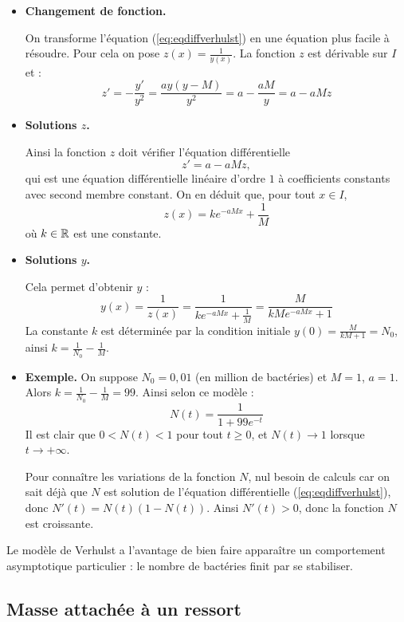 \documentclass[class=report,crop=false]{standalone}
\begin{document}
\begin{itemize}


  \item \textbf{Changement de fonction.}

  On transforme l'équation (\ref{eq:eqdiffverhulst})
  en une équation plus facile à résoudre.
  Pour cela on pose $z(x) = \frac{1}{y(x)}$.
  La fonction $z$ est dérivable sur $I$ et :
  $$z'=-\frac{y'}{y^2} = \frac{ay(y-M)}{y^2} = a - \frac{aM}{y} = a-aMz$$


  \item \textbf{Solutions $z$.}

  Ainsi la fonction $z$ doit vérifier l'équation différentielle
  $$z' = a-aMz,$$
  qui est une équation différentielle linéaire d'ordre $1$
  à coefficients constants avec second membre constant.
  On en déduit que, pour tout $x \in I$,
  $$z(x) = k e^{-aMx} + \frac1M$$
  où $k \in \mathbb{R}$ est une constante.

  \item \textbf{Solutions $y$.}

  Cela permet d'obtenir $y$ :
  $$y(x) = \frac{1}{z(x)} = \frac{1}{k e^{-aMx} + \frac1M} = \frac{M}{kM e^{-aMx}+1}$$
  La constante $k$ est déterminée par la condition initiale
  $y(0) = \frac{M}{kM+1}=N_0$, ainsi $k = \frac{1}{N_0}-\frac{1}{M}$.

  \item \textbf{Exemple.}
  On suppose $N_0 = 0,01$ (en million de bactéries) et $M=1$, $a=1$.
  Alors $k = \frac{1}{N_0}-\frac{1}{M} = 99$.
  Ainsi selon ce modèle :
  $$N(t) = \frac{1}{1 + 99 e^{-t}}$$
  Il est clair que $0<N(t)<1$ pour tout $t\ge0$, et
  $N(t) \to 1$ lorsque $t\to+\infty$.

  Pour connaître les variations de la fonction $N$, nul besoin de calculs car on sait déjà que
  $N$ est solution de l'équation différentielle (\ref{eq:eqdiffverhulst}), donc
  $N'(t) = N(t)(1 - N(t))$.
  Ainsi $N'(t)>0$, donc la fonction $N$ est croissante.
\end{itemize}



Le modèle de Verhulst a l'avantage de
bien faire apparaître un comportement asymptotique particulier :
le nombre de bactéries finit par se stabiliser.




\subsection{Masse attachée à un ressort}
\end{document}

